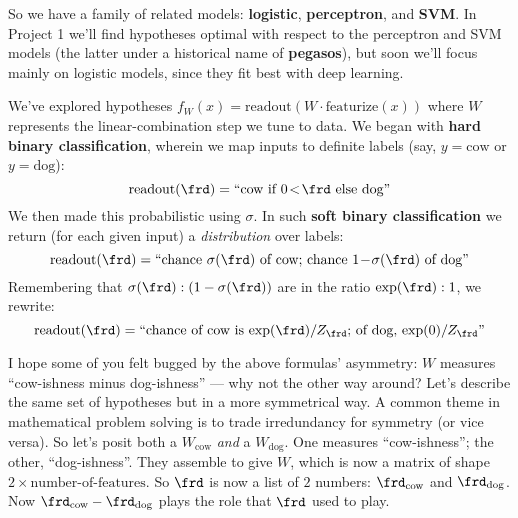   So we have a family of related models: \textbf{logistic},
  \textbf{perceptron}, and \textbf{SVM}.  In Project 1 we'll find hypotheses
  optimal with respect to the perceptron and SVM models (the latter under a
  historical name of \textbf{pegasos}), but soon we'll focus mainly on
  logistic models, since they fit best with deep learning.





  We've explored hypotheses
  $
    f_{W}(x) = \text{readout}(W \cdot \text{featurize}(x))
  $
  where $W$ represents the linear-combination step we tune to data.
  We began with \textbf{hard binary classification}, wherein we map inputs
  to definite labels (say, $y=\text{cow}$ or $y=\text{dog}$):
  $$
    \text{readout}(\frd) = \text{``$\text{cow}$ if $0\!<\!\frd$ else $\text{dog}$''}
  $$
  We then made this probabilistic using $\sigma$.  In such \textbf{soft binary
  classification} we return (for each given input) a \emph{distribution} over labels:
  $$
    \text{readout}(\frd) =
    \text{``chance $\sigma(\frd)$ of $\text{cow}$;
            chance $1\!-\!\sigma(\frd)$ of $\text{dog}$''}
  $$
  Remembering that $\sigma(\frd) : (1-\sigma(\frd))$ are in the ratio
  $\exp(\frd) : 1$, we rewrite:
  $$
    \text{readout}(\frd) =
    \text{``chance of $\text{cow}$ is $\exp(\frd)/Z_\frd$;
            of $\text{dog}$, $\exp(0)/Z_\frd$''}
  $$


  I hope some of you felt bugged by the above formulas' asymmetry: $W$ measures
  ``cow-ishness minus dog-ishness'' --- why not the other way around?  Let's
  describe the same set of hypotheses but in a more symmetrical way.  A common
  theme in mathematical problem solving is to trade irredundancy for symmetry
  (or vice versa).  So let's posit both
  a $W_{\text{cow}}$ \emph{and}
  a $W_{\text{dog}}$.  One measures ``cow-ishness''; the other,
  ``dog-ishness''.  They assemble to give $W$, which is now a matrix of shape
  $2\!\times\!\text{number-of-features}$.  So $\frd$ is now a list of $2$ numbers:
  $\frd_{\text{cow}}$ and
  $\frd_{\text{dog}}$.
  Now $\frd_{\text{cow}} - \frd_{\text{dog}}$ plays the role that $\frd$
  used to play.


